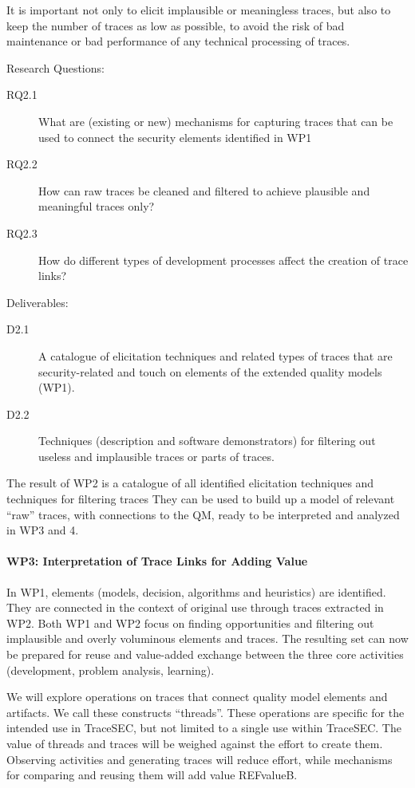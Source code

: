 It is important not only to elicit implausible or meaningless traces, but also to keep the number of traces as low as possible, to avoid the risk of bad maintenance or bad performance of any technical processing of traces.

Research Questions:
\begin{description}
\item[RQ2.1]  What are (existing or new) mechanisms for capturing traces that can be used to connect the security elements identified in WP1
\item[RQ2.2] How can raw traces be cleaned and filtered to achieve plausible and meaningful traces only?
\item[RQ2.3] How do different types of development processes affect the creation of trace links?
\end{description}

Deliverables: 
\begin{description}
\item[D2.1] A catalogue of elicitation techniques and related types of traces that are security-related and touch on elements of the extended quality models (WP1). 
\item[D2.2] Techniques (description and software demonstrators) for filtering out useless and implausible traces or parts of traces.
\end{description}

The result of WP2 is a catalogue of all identified elicitation techniques and techniques for filtering traces They can be used to build up a model of relevant “raw” traces, with connections to the QM, ready to be interpreted and analyzed in WP3 and 4.

\paragraph*{WP3: Interpretation of Trace Links for Adding Value}
In WP1, elements (models, decision, algorithms and heuristics) are identified. They are connected in the context of original use through traces extracted in WP2. Both WP1 and WP2 focus on finding opportunities and filtering out implausible and overly voluminous elements and traces. The resulting set can now be prepared for reuse and value-added exchange between the three core activities (development, problem analysis, learning). 

We will explore operations on traces that connect quality model elements and artifacts. We call these constructs “threads”. These operations are specific for the intended use in TraceSEC, but not limited to a single use within TraceSEC. The value of threads and traces will be weighed against the effort to create them. Observing activities and generating traces will reduce effort, while mechanisms for comparing and reusing them will add value REFvalueB.

